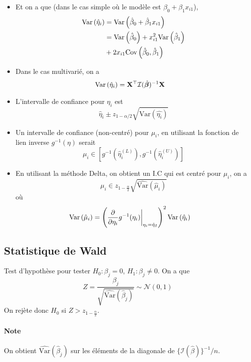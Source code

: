 \documentclass[10pt, french]{article}
\begin{document}
\begin{multicols*}{3}
\begin{itemize}
\item Et on a que (dans le cas simple où le modèle est $\beta_0 + \beta_1 x_{i1}$),
\begin{align*}
\mathrm{Var} \left( \hat{\eta}_i \right)	& = \mathrm{Var} \left( \hat{\beta}_0 + \hat{\beta}_1 x_{i1} \right) \\
& = \mathrm{Var} \left( \hat{\beta}_0 \right) + x_{i1}^2 \mathrm{Var} \left( \hat{\beta}_1 \right)  \\
& + 2 x _{i1}  \mathrm{Cov} \left( \hat{\beta}_0, \hat{\beta}_1 \right)
\end{align*}

\item Dans le cas multivarié, on a
\begin{align*}
\mathrm{Var} \left( \hat{\eta}_i \right)	 & = \mathbf{X}^{\top} \mathcal{I}(\hat{\bm{\beta}})^{-1} \mathbf{X}
\end{align*}

\item L'intervalle de confiance  pour $\eta_i$ est
\[\hat{\eta}_i  \pm z_{1- \alpha/2} \sqrt{\widehat{\mathrm{Var}}(\hat{\eta_i})} \]

\item Un intervalle de confiance (non-centré) pour $\mu_i$, en utilisant la fonction de lien inverse $g^{-1}(\eta)$ serait
\[ \mu_i \in \left [ g^{-1} \left( \hat{\eta}_i^{(L)}\right),  g^{-1} \left( \hat{\eta}_i^{(U)} \right)      \right]   \]

\item En utilisant la méthode Delta, on obtient un I.C qui est centré pour $\mu_i$, on a
\[\mu_i \in z_{1 - \frac{\alpha}{2}} \sqrt{\widehat{\mathrm{Var}}(\hat{\mu}_i)}  \]
où
\begin{align*}
\mathrm{Var} \left( \hat{\mu}_i \right)	& = \left( \frac{\partial}{\partial \eta_i} g^{-1}(\eta_i) \biggr \rvert_{\eta_i = \hat{\eta}_I} \right)^2 \mathrm{Var} \left( \hat{\eta}_i \right)
\end{align*}
\end{itemize}



\subsection*{Statistique de Wald}
Test d'hypothèse pour tester $H_0 : \beta_j = 0$, $H_1 : \beta_j \neq 0$. On a que
\[Z = \frac{\beta_j}{\sqrt{\widehat{\mathrm{Var}}(\hat{\beta}_j)}} \sim \mathcal{N}(0,1) \]
On rejète donc $H_0$ si $Z > z_{1 - \frac{\alpha}{2}}$.

\paragraph{Note} On obtient $\widehat{\mathrm{Var}}(\hat{\beta}_j)$ sur les éléments de la diagonale de $\{ \mathcal{I}(\hat{\beta}) \}^{-1} / n$.


\end{multicols*}
\end{document}

